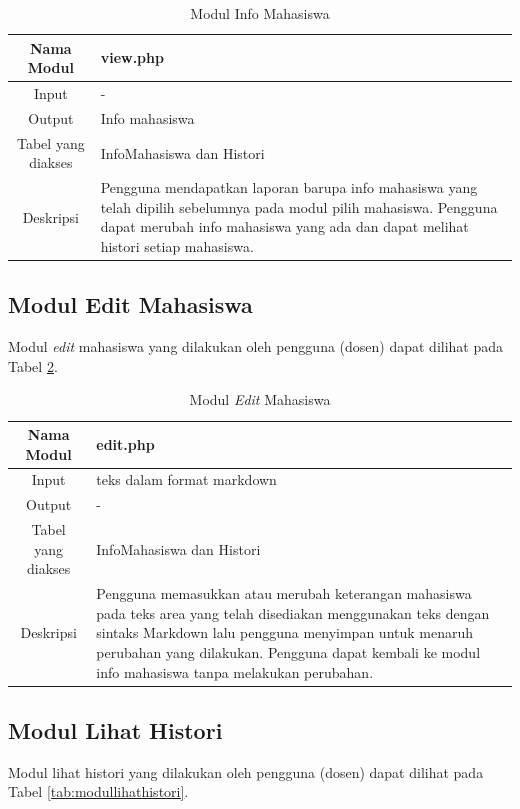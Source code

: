 \begin{table}[ht]
\centering
\caption[Tabel Modul Info Mahasiswa]{Modul Info Mahasiswa}
\label{tab:modulinfomahasiswa}
\begin{tabular}{|c|p{7cm}|}
\hline
Nama Modul & view.php\\
\hline
Input & -\\
\hline
Output & Info mahasiswa\\
\hline
Tabel yang diakses & InfoMahasiswa dan Histori\\
\hline
Deskripsi & Pengguna mendapatkan laporan barupa info mahasiswa yang telah
dipilih sebelumnya pada modul pilih mahasiswa. Pengguna dapat merubah info
mahasiswa yang ada dan dapat melihat histori setiap mahasiswa.\\
\hline
\end{tabular}
\end{table}

\subsection{Modul Edit Mahasiswa}
Modul {\it edit} mahasiswa yang dilakukan oleh pengguna (dosen) dapat dilihat
pada Tabel \ref{tab:moduleditmahasiswa}.

\begin{table}[ht]
\centering
\caption[Tabel Modul {\it Edit} Mahasiswa]{Modul {\it Edit} Mahasiswa}
\label{tab:moduleditmahasiswa}
\begin{tabular}{|c|p{7cm}|}
\hline
Nama Modul & edit.php\\
\hline
Input & teks dalam format markdown\\
\hline
Output & -\\
\hline
Tabel yang diakses & InfoMahasiswa dan Histori\\
\hline
Deskripsi & Pengguna memasukkan atau merubah keterangan mahasiswa pada teks area
yang telah disediakan menggunakan teks dengan sintaks Markdown lalu
pengguna menyimpan untuk menaruh perubahan yang dilakukan. Pengguna dapat
kembali ke modul info mahasiswa tanpa melakukan perubahan.\\
\hline
\end{tabular}
\end{table}

\subsection{Modul Lihat Histori}
Modul lihat histori yang dilakukan oleh pengguna (dosen) dapat dilihat pada
Tabel \ref{tab:modullihathistori}.

